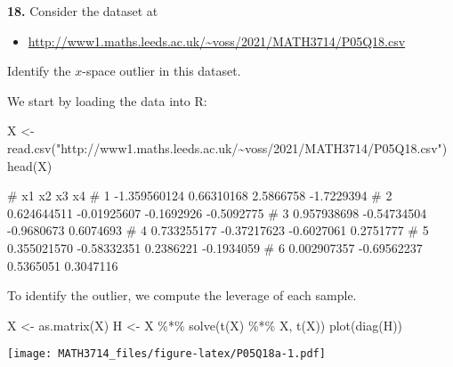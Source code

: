 \documentclass[
  a4paper,
]{article}
\newenvironment{Shaded}{\begin{snugshade}}{\end{snugshade}}
\newcommand{\FunctionTok}[1]{\textcolor[rgb]{0.00,0.00,0.00}{#1}}
\newcommand{\NormalTok}[1]{#1}
\newcommand{\OtherTok}[1]{\textcolor[rgb]{0.56,0.35,0.01}{#1}}
\newcommand{\SpecialCharTok}[1]{\textcolor[rgb]{0.00,0.00,0.00}{#1}}
\newcommand{\StringTok}[1]{\textcolor[rgb]{0.31,0.60,0.02}{#1}}
\providecommand{\tightlist}{%
  \setlength{\itemsep}{0pt}\setlength{\parskip}{0pt}}
\theoremstyle{definition}
\theoremstyle{definition}
\theoremstyle{definition}
\theoremstyle{definition}
\theoremstyle{remark}
\begin{document}
\textbf{18.}
Consider the dataset at

\begin{itemize}
\tightlist
\item
  \url{http://www1.maths.leeds.ac.uk/~voss/2021/MATH3714/P05Q18.csv}
\end{itemize}

Identify the \(x\)-space outlier in this dataset.

\begin{myanswers}
We start by loading the data into R:

\begin{Shaded}
\begin{Highlighting}[]
\NormalTok{X }\OtherTok{\textless{}{-}} \FunctionTok{read.csv}\NormalTok{(}\StringTok{"http://www1.maths.leeds.ac.uk/\textasciitilde{}voss/2021/MATH3714/P05Q18.csv"}\NormalTok{)}
\FunctionTok{head}\NormalTok{(X)}
\end{Highlighting}
\end{Shaded}

\begin{Shaded}
\begin{Highlighting}[]
\NormalTok{\#             x1          x2         x3         x4}
\NormalTok{\# 1 {-}1.359560124  0.66310168  2.5866758 {-}1.7229394}
\NormalTok{\# 2  0.624644511 {-}0.01925607 {-}0.1692926 {-}0.5092775}
\NormalTok{\# 3  0.957938698 {-}0.54734504 {-}0.9680673  0.6074693}
\NormalTok{\# 4  0.733255177 {-}0.37217623 {-}0.6027061  0.2751777}
\NormalTok{\# 5  0.355021570 {-}0.58332351  0.2386221 {-}0.1934059}
\NormalTok{\# 6  0.002907357 {-}0.69562237  0.5365051  0.3047116}
\end{Highlighting}
\end{Shaded}

To identify the outlier, we compute the leverage of each sample.

\begin{Shaded}
\begin{Highlighting}[]
\NormalTok{X }\OtherTok{\textless{}{-}} \FunctionTok{as.matrix}\NormalTok{(X)}
\NormalTok{H }\OtherTok{\textless{}{-}}\NormalTok{ X }\SpecialCharTok{\%*\%} \FunctionTok{solve}\NormalTok{(}\FunctionTok{t}\NormalTok{(X) }\SpecialCharTok{\%*\%}\NormalTok{ X, }\FunctionTok{t}\NormalTok{(X))}
\FunctionTok{plot}\NormalTok{(}\FunctionTok{diag}\NormalTok{(H))}
\end{Highlighting}
\end{Shaded}

\texttt{[image: MATH3714\_files/figure-latex/P05Q18a-1.pdf]}


\end{myanswers}
\end{document}
